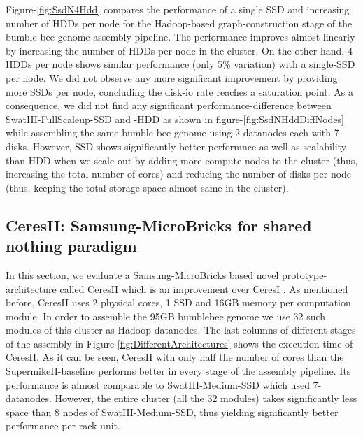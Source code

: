 \documentclass[conference]{IEEEtran}
\begin{document}
Figure-\ref{fig:SsdN4Hdd} compares the performance of a single SSD and  increasing number of HDDs per node for the Hadoop-based graph-construction stage of the bumble bee genome assembly pipeline.
The performance improves almost linearly by increasing the number of HDDs per node in the cluster.
On the other hand, 4-HDDs per node shows similar performance (only 5\% variation) with a single-SSD per node.
We did not observe any more significant improvement by providing more SSDs per node, concluding the disk-io rate reaches a saturation point.
As a consequence, we did not find any significant performance-difference between SwatIII-FullScaleup-SSD and -HDD as shown in figure-\ref{fig:SsdNHddDiffNodes} while assembling the same bumble bee genome using 2-datanodes each with 7-disks.
However, SSD shows significantly better performnce as well as scalability than HDD when we scale out by adding more compute nodes to the cluster (thus, increasing the total number of cores) and reducing the number of disks per node (thus, keeping the total storage space almost same in the cluster).

\subsection {CeresII: Samsung-MicroBricks for shared nothing paradigm} \label{CeresII:Scaledout-in-a-boxAndSSD}

In this section, we evaluate a Samsung-MicroBricks based novel prototype-architecture called CeresII which is an improvement over CeresI \cite{Cluster:ceres1}.  
As mentioned before, CeresII uses 2 physical cores, 1 SSD and 16GB memory per computation module.
In order to assemble the 95GB bumblebee genome we use 32 such modules of this cluster as Hadoop-datanodes.
The last columns of different stages of the assembly in Figure-\ref{fig:DifferentArchitectures} shows the execution time of CeresII.
As it can be seen, CeresII with only half the number of cores than the SupermikeII-baseline performs better in every stage of the assembly pipeline.
Its performance is almost comparable to SwatIII-Medium-SSD which used 7-datanodes.
However, the entire cluster (all the 32 modules) takes significantly less space than 8 nodes of SwatIII-Medium-SSD, thus yielding significantly better performance per rack-unit.
\end{document}
